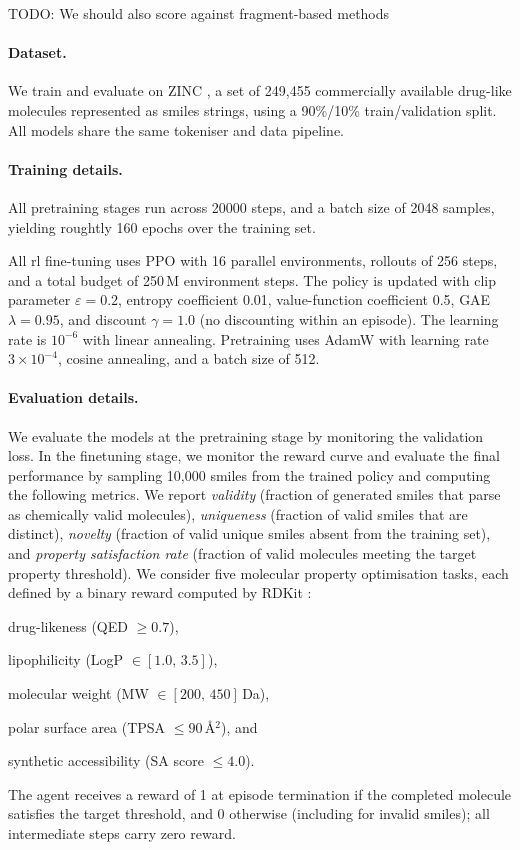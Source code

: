\documentclass[10pt]{article} %
\begin{document}
TODO: We should also score against fragment-based methods

\paragraph{Dataset.}
We train and evaluate on ZINC \citep{irwin2012zinc}, a set of 249,455 commercially available drug-like molecules represented as \gls{smiles} strings, using a 90\%/10\% train/validation split.
All models share the same tokeniser and data pipeline.


\paragraph{Training details.}
All pretraining stages run across 20000 steps, and a batch size of 2048 samples, yielding roughtly 160 epochs over the training set.

All \gls{rl} fine-tuning uses PPO \citep{schulman2017proximal} with 16 parallel environments, rollouts of 256 steps, and a total budget of 250\,M environment steps.
The policy is updated with clip parameter $\varepsilon = 0.2$, entropy coefficient 0.01, value-function coefficient 0.5, GAE $\lambda = 0.95$, and discount $\gamma = 1.0$ (no discounting within an episode).
The learning rate is $10^{-6}$ with linear annealing.
Pretraining uses AdamW with learning rate $3 \times 10^{-4}$, cosine annealing, and a batch size of 512.


\paragraph{Evaluation details.}
We evaluate the models at the pretraining stage by monitoring the validation loss.
In the finetuning stage, we monitor the reward curve and evaluate the final performance by sampling 10,000 \gls{smiles} from the trained policy and computing the following metrics.
We report \textit{validity} (fraction of generated \gls{smiles} that parse as chemically valid molecules), \textit{uniqueness} (fraction of valid \gls{smiles} that are distinct), \textit{novelty} (fraction of valid unique \gls{smiles} absent from the training set), and \textit{property satisfaction rate} (fraction of valid molecules meeting the target property threshold).
We consider five molecular property optimisation tasks, each defined by a binary reward computed by RDKit \citep{landrum2006rdkit}:
\begin{enumerate*}[label=(\roman*)]
      \item drug-likeness (QED $\geq 0.7$),
      \item lipophilicity (LogP $\in [1.0,\, 3.5]$),
      \item molecular weight (MW $\in [200,\, 450]$\,Da),
      \item polar surface area (TPSA $\leq 90$\,\AA$^2$), and
      \item synthetic accessibility (SA score $\leq 4.0$).
\end{enumerate*}
The agent receives a reward of 1 at episode termination if the completed molecule satisfies the target threshold, and 0 otherwise (including for invalid \gls{smiles}); all intermediate steps carry zero reward.
\end{document}
